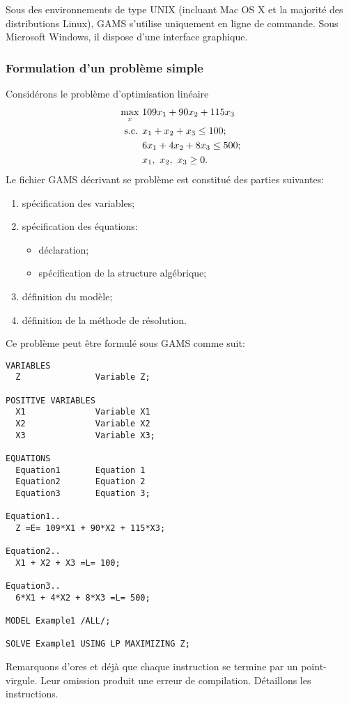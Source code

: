 Sous des environnements de type UNIX (incluant Mac OS X et la majorité des distributions Linux), GAMS s'utilise uniquement en ligne de commande.
Sous Microsoft Windows, il dispose d'une interface graphique.

\subsubsection{Formulation d'un problème simple}

\begin{example}
\label{gams_simple}
Considérons le problème d'optimisation linéaire
\begin{align*}
\max_x \ & 109 x_1 + 90 x_2 + 115 x_3 \\
\mbox{s.c. } & x_1 + x_2 + x_3 \leq 100; \\
& 6x_1 + 4x_2 + 8x_3 \leq 500; \\
& x_1,\ x_2,\ x_3 \geq 0.
\end{align*}
Le fichier GAMS décrivant se problème est constitué des parties suivantes:
\begin{enumerate}
\item
spécification des variables;
\item
spécification des équations:
\begin{itemize}
\item
déclaration;
\item
spécification de la structure algébrique;
\end{itemize}
\item
définition du modèle;
\item
définition de la méthode de résolution.
\end{enumerate}
Ce problème peut être formulé sous GAMS comme suit:
\begin{verbatim}
VARIABLES
  Z               Variable Z;

POSITIVE VARIABLES
  X1              Variable X1
  X2              Variable X2
  X3              Variable X3;

EQUATIONS
  Equation1       Equation 1
  Equation2       Equation 2
  Equation3       Equation 3;

Equation1..
  Z =E= 109*X1 + 90*X2 + 115*X3;

Equation2..
  X1 + X2 + X3 =L= 100;

Equation3..
  6*X1 + 4*X2 + 8*X3 =L= 500;

MODEL Example1 /ALL/;

SOLVE Example1 USING LP MAXIMIZING Z;
\end{verbatim}
Remarquons d'ores et déjà que chaque instruction se termine par un point-virgule.
Leur omission produit une erreur de compilation.
Détaillons les instructions.
\end{example}

